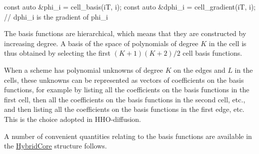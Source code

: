 \begin{DoxyCode}
\textcolor{keyword}{const} \textcolor{keyword}{auto} &phi\_i = cell\_basis(iT, i);
\textcolor{keyword}{const} \textcolor{keyword}{auto} &dphi\_i = cell\_gradient(iT, i);  \textcolor{comment}{// dphi\_i is the gradient of phi\_i}
\end{DoxyCode}


The basis functions are hierarchical, which means that they are constructed by increasing degree. A basis of the space of polynomials of degree $K$ in the cell is thus obtained by selecting the first $(K+1)(K+2)/2$ cell basis functions.

When a scheme has polynomial unknowns of degree $K$ on the edges and $L$ in the cells, these unknowns can be represented as vectors of coefficients on the basis functions, for example by listing all the coefficients on the basis functions in the first cell, then all the coefficients on the basis functions in the second cell, etc., and then listing all the coefficients on the basis functions in the first edge, etc. This is the choice adopted in H\+H\+O-\/diffusion.

A number of convenient quantities relating to the basis functions are available in the \hyperlink{classHArDCore2D_1_1HybridCore}{Hybrid\+Core} structure follows.

